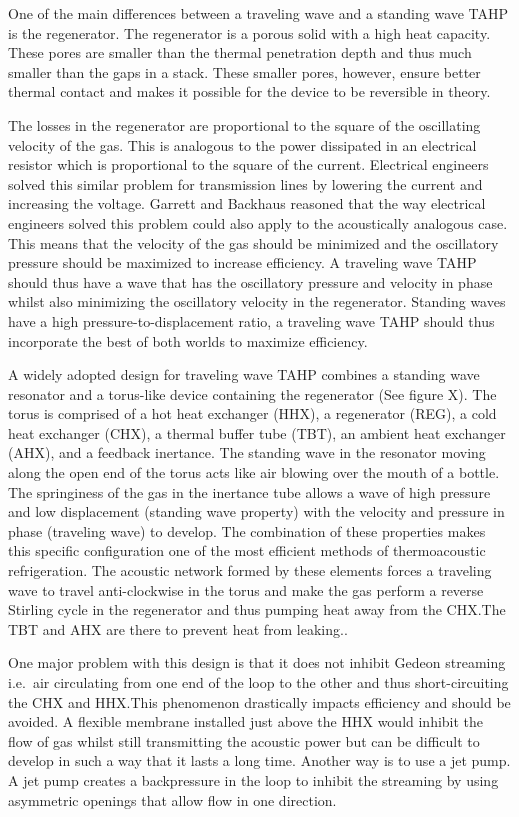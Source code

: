 \documentclass[a4paper]{article}
\newcommand{\newpara}
    {
      \bigbreak{}
      \noindent
    }
\begin{document}
One of the main differences between a traveling wave and a standing wave TAHP is the regenerator. The regenerator is a porous solid with a high heat capacity. These pores are smaller than the thermal penetration depth and thus much smaller than the gaps in a stack. These smaller pores, however, ensure better thermal contact and makes it possible for the device to be reversible in theory.
\newpara{}
The losses in the regenerator are proportional to the square of the oscillating velocity of the gas. This is analogous to the power dissipated in an electrical resistor which is proportional to the square of the current. Electrical engineers solved this similar problem for transmission lines by lowering the current and increasing the voltage. Garrett and Backhaus\cite{powerofsound} reasoned that the way electrical engineers solved this problem could also apply to the acoustically analogous case. This means that the velocity of the gas should be minimized and the oscillatory pressure should be maximized to increase efficiency. A traveling wave TAHP should thus have a wave that has the oscillatory pressure and velocity in phase whilst also minimizing the oscillatory velocity in the regenerator. Standing waves have a high pressure-to-displacement ratio, a traveling wave TAHP should thus incorporate the best of both worlds to maximize efficiency.
\newpara{}
A widely adopted design for traveling wave TAHP combines a standing wave resonator and a torus-like device containing the regenerator (See figure X). The torus is comprised of a hot heat exchanger (HHX), a regenerator (REG), a cold heat exchanger (CHX), a thermal buffer tube (TBT), an ambient heat exchanger (AHX), and a feedback inertance. The standing wave in the resonator moving along the open end of the torus acts like air blowing over the mouth of a bottle. The springiness of the gas in the inertance tube allows a wave of high pressure and low displacement (standing wave property) with the velocity and pressure in phase (traveling wave) to develop. The combination of these properties makes this specific configuration one of the most efficient methods of thermoacoustic refrigeration. The acoustic network formed by these elements forces a traveling wave to travel anti-clockwise in the torus and make the gas perform a reverse Stirling cycle in the regenerator and thus pumping heat away from the CHX.\@ The TBT and AHX are there to prevent heat from leaking.\cite{TijaniAHighPerformanceThermoacousticEngine}.
\newpara{}
One major problem with this design is that it does not inhibit Gedeon streaming i.e.\ air circulating from one end of the loop to the other and thus short-circuiting the CHX and HHX.\@ This phenomenon drastically impacts efficiency and should be avoided. A flexible membrane installed just above the HHX would inhibit the flow of gas whilst still transmitting the acoustic power but can be difficult to develop in such a way that it lasts a long time. Another way is to use a jet pump. A jet pump creates a backpressure in the loop to inhibit the streaming by using asymmetric openings that allow flow in one direction.
\end{document}
